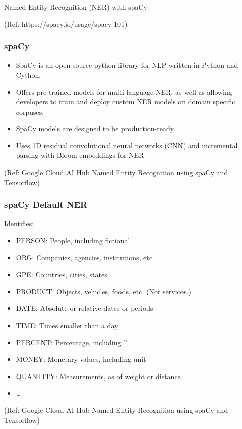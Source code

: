 \begin{frame}[fragile]\frametitle{}

\begin{center}
{\Large Named Entity Recognition (NER) with spaCy}

{\tiny (Ref: https://spacy.io/usage/spacy-101)}

\end{center}


\end{frame}


\begin{frame}[fragile]\frametitle{spaCy}
  \begin{itemize}
  \item SpaCy is an open-source python library for NLP written in Python and Cython. 
	\item Offers pre-trained models for multi-language NER, as well as allowing developers to train and deploy custom NER models on domain specific corpuses. 
	\item SpaCy models are designed to be production-ready.
	\item Uses 1D residual convolutional neural networks (CNN) and incremental parsing with Bloom embeddings for NER
  \end{itemize}
	
	{\tiny (Ref: Google Cloud AI Hub Named Entity Recognition using spaCy and Tensorflow)}
\end{frame}

\begin{frame}[fragile]\frametitle{spaCy Default NER}
Identifies:
  \begin{itemize}
  \item PERSON:	People, including fictional
	\item ORG:	Companies, agencies, institutions, etc
	\item GPE:	Countries, cities, states
	\item PRODUCT:	Objects, vehicles, foods, etc. (Not services.)
	\item DATE:	Absolute or relative dates or periods
	\item TIME:	Times smaller than a day
	\item PERCENT:	Percentage, including ”%
	\item MONEY:	Monetary values, including unit
	\item QUANTITY:	Measurements, as of weight or distance
	\item \ldots
  \end{itemize}
	
	{\tiny (Ref: Google Cloud AI Hub Named Entity Recognition using spaCy and Tensorflow)}
\end{frame}

